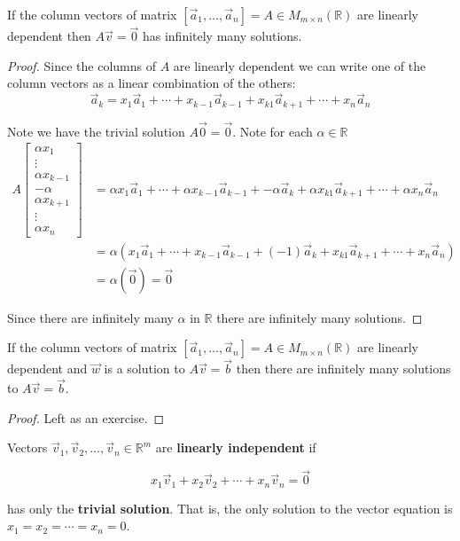 \begin{proposition}\label{prop:zero_dependent} If the column vectors of matrix $[\vec{a}_1, \ldots, \vec{a}_n]=A \in M_{m\times n}(\mathbb{R})$ are linearly dependent then $A\vec{v}=\vec{0}$ has infinitely many solutions.
\end{proposition}
\begin{proof}
Since the columns of $A$ are linearly dependent we can write one of the column vectors as a linear combination of the others:
\[
\vec{a}_k = x_1\vec{a}_1+\cdots+x_{k-1}\vec{a}_{k-1}+x_{k1}\vec{a}_{k+1}+\cdots+x_n\vec{a}_n
\]

Note we have the trivial solution $A\vec{0}=\vec{0}$. Note for each $\alpha \in \mathbb{R}$ 
\begin{align*}
A \begin{bmatrix}\alpha x_1 \\ \vdots \\ \alpha x_{k-1} \\ -\alpha \\ \alpha x_{k+1} \\ \vdots \\ \alpha x_n \end{bmatrix}
&= \alpha x_1\vec{a}_1+\cdots+ \alpha x_{k-1}\vec{a}_{k-1}+-\alpha \vec{a}_k+ \alpha x_{k1}\vec{a}_{k+1}+\cdots+\alpha x_n\vec{a}_n\\
&= \alpha (x_1\vec{a}_1+\cdots+ x_{k-1}\vec{a}_{k-1}+(-1)\vec{a}_k+  x_{k1}\vec{a}_{k+1}+\cdots+ x_n\vec{a}_n) \\
&= \alpha(\vec{0}) = \vec{0}
\end{align*}

Since there are infinitely many $\alpha$ in $\mathbb{R}$ there are infinitely many solutions.
\end{proof}

\begin{proposition}\label{prop:zero_dependent} If the column vectors of matrix $[\vec{a}_1, \ldots, \vec{a}_n]=A \in M_{m\times n}(\mathbb{R})$ are linearly dependent and $\vec{w}$ is a solution to $A\vec{v}=\vec{b}$ then there are infinitely many solutions to $A\vec{v}=\vec{b}$.
\end{proposition}
\begin{proof}
Left as an exercise.
\end{proof}

\begin{definition}
Vectors $\vec{v}_1, \vec{v}_2, \ldots, \vec{v}_n \in \mathbb{R}^m$ are \textbf{linearly independent} if 

$$x_1\vec{v}_1+x_2\vec{v}_2+\cdots + x_n \vec{v}_n=\vec{0}$$

has only the \textbf{trivial solution}. That is, the only solution to the vector equation is $x_1=x_2=\cdots=x_n=0$.  
\end{definition}

